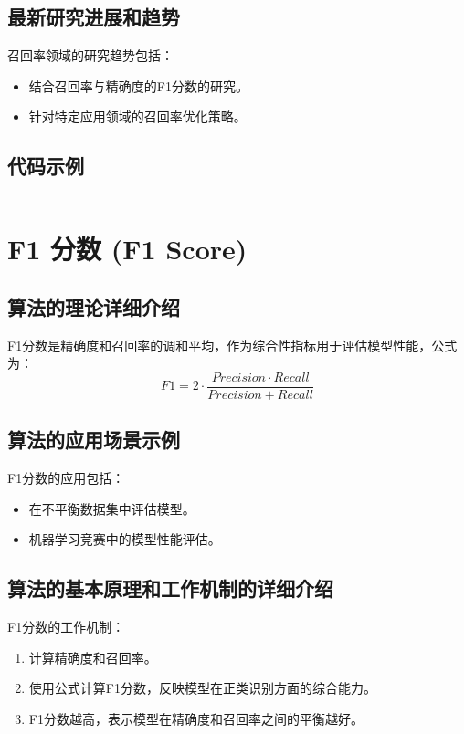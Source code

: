 \subsection*{最新研究进展和趋势}
召回率领域的研究趋势包括：
\begin{itemize}
    \item 结合召回率与精确度的F1分数的研究。
    \item 针对特定应用领域的召回率优化策略。
\end{itemize}
\subsection*{代码示例}
\begin{lstlisting}

\end{lstlisting}


\section{F1 分数 (F1 Score)}
\subsection*{算法的理论详细介绍}
F1分数是精确度和召回率的调和平均，作为综合性指标用于评估模型性能，公式为：
\[
    F1 = 2 \cdot \frac{Precision \cdot Recall}{Precision + Recall}
\]

\subsection*{算法的应用场景示例}
F1分数的应用包括：
\begin{itemize}
    \item 在不平衡数据集中评估模型。
    \item 机器学习竞赛中的模型性能评估。
\end{itemize}

\subsection*{算法的基本原理和工作机制的详细介绍}
F1分数的工作机制：
\begin{enumerate}
    \item 计算精确度和召回率。
    \item 使用公式计算F1分数，反映模型在正类识别方面的综合能力。
    \item F1分数越高，表示模型在精确度和召回率之间的平衡越好。
\end{enumerate}

